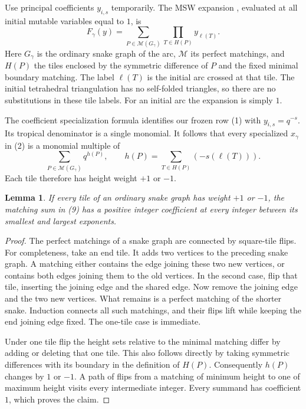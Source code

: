\documentclass[11pt]{article}
\newtheorem{lemma}[theorem]{Lemma}
\begin{document}
Use principal coefficients $y_{i,s}$ temporarily. The MSW expansion
\cite[Theorem 4.9]{msw}, evaluated at all initial mutable variables equal to
$1$, is
\[
 F_\gamma(y)=\sum_{P\in\mathcal M(G_\gamma)}
                   \prod_{T\in H(P)} y_{\ell(T)}. \tag{8}
\]
Here $G_\gamma$ is the ordinary snake graph of the arc, $\mathcal M$ its perfect
matchings, and $H(P)$ the tiles enclosed by the symmetric difference of $P$
and the fixed minimal boundary matching. The label $\ell(T)$ is the initial
arc crossed at that tile. The initial tetrahedral triangulation has no
self-folded triangles, so there are no substitutions in these tile labels.
For an initial arc the expansion is simply $1$.

The coefficient specialization formula
\cite[Theorem 2.13]{msw} identifies our frozen row (1) with
$y_{i,s}=q^{-s}$. Its tropical denominator is a single monomial. It follows
that every specialized $x_\gamma$ in (2) is a monomial multiple of
\[
 \sum_{P\in\mathcal M(G_\gamma)}q^{h(P)},\qquad
 h(P)=\sum_{T\in H(P)}(-s(\ell(T))). \tag{9}
\]
Each tile therefore has height weight $+1$ or $-1$.

\begin{lemma}\label{gaps}
If every tile of an ordinary snake graph has weight $+1$ or $-1$, the
matching sum in (9) has a positive integer coefficient at every integer
between its smallest and largest exponents.
\end{lemma}
\begin{proof}
The perfect matchings of a snake graph are connected by square-tile flips.
For completeness, take an end tile. It adds two vertices to the preceding
snake graph. A matching either contains the edge joining these two new
vertices, or contains both edges joining them to the old vertices. In the
second case, flip that tile, inserting the joining edge and the shared edge.
Now remove the joining edge and the two new vertices. What remains is a
perfect matching of the shorter snake. Induction connects all such matchings,
and their flips lift while keeping the end joining edge fixed. The one-tile
case is immediate.

Under one tile flip the height sets relative to the minimal matching differ
by adding or deleting that one tile. This also follows directly by taking
symmetric differences with its boundary in the definition of $H(P)$.
Consequently $h(P)$ changes by $1$ or $-1$. A path of flips from a matching
of minimum height to one of maximum height visits every intermediate integer.
Every summand has coefficient $1$, which proves the claim.
\end{proof}
\end{document}
